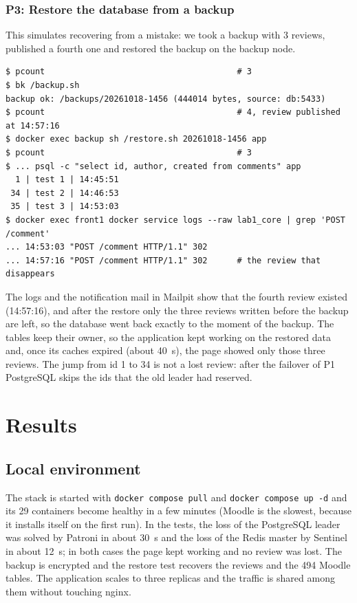 \documentclass[11pt,a4paper]{article}
\begin{document}
\subsubsection*{P3: Restore the database from a backup}

This simulates recovering from a mistake: we took a backup with 3 reviews, published a
fourth one and restored the backup on the backup node.
\begin{lstlisting}
$ pcount                                       # 3
$ bk /backup.sh
backup ok: /backups/20261018-1456 (444014 bytes, source: db:5433)
$ pcount                                       # 4, review published at 14:57:16
$ docker exec backup sh /restore.sh 20261018-1456 app
$ pcount                                       # 3
$ ... psql -c "select id, author, created from comments" app
  1 | test 1 | 14:45:51
 34 | test 2 | 14:46:53
 35 | test 3 | 14:53:03
$ docker exec front1 docker service logs --raw lab1_core | grep 'POST /comment'
... 14:53:03 "POST /comment HTTP/1.1" 302
... 14:57:16 "POST /comment HTTP/1.1" 302      # the review that disappears
\end{lstlisting}
The logs and the notification mail in Mailpit show that the fourth review existed (14:57:16),
and after the restore only the three reviews written before the backup are left, so the
database went back exactly to the moment of the backup. The tables keep their owner, so the
application kept working on the restored data and, once its caches expired (about 40~s),
the page showed only those three reviews. The jump from id 1 to 34 is not a lost review:
after the failover of P1 PostgreSQL skips the ids that the old leader had reserved.

\section{Results}

\subsection{Local environment}

The stack is started with \texttt{docker compose pull} and \texttt{docker compose up -d}
and its 29 containers become healthy in a few minutes (Moodle is the slowest, because it
installs itself on the first run). In the tests, the loss of the PostgreSQL leader was
solved by Patroni in about 30~s and the loss of the Redis master by Sentinel in about
12~s; in both cases the page kept working and no review was lost. The backup is encrypted
and the restore test recovers the reviews and the 494 Moodle tables. The application
scales to three replicas and the traffic is shared among them without touching nginx.
\end{document}
